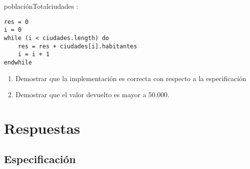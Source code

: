 \documentclass[10pt,a4paper]{article}
\begin{document}
\begin{proc} {poblaci\'onTotal}{\In ciudades : }{\ent}
\end{proc}


\begin{lstlisting}
res = 0
i = 0
while (i < ciudades.length) do
    res = res + ciudades[i].habitantes 
    i = i + 1
endwhile
\end{lstlisting}

    \begin{enumerate}
        \item Demostrar que la implementaci\'on es correcta con respecto a la especificaci\'on
        \item Demostrar que el valor devuelto es mayor a 50.000.
    \end{enumerate}




\section{Respuestas}

\subsection{Especificaci\'on}
\end{document}
